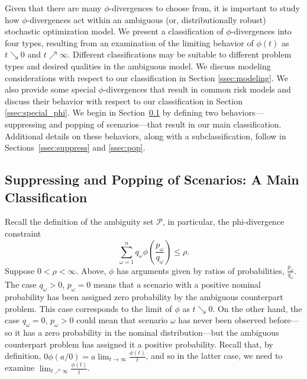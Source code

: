 \documentclass[opre,nonblindrev]{informs3} %
\begin{document}
Given that there are many $\phi$-divergences to choose from, it is important to study how $\phi$-divergences act within an ambiguous (or, distributionally robust) stochastic optimization model. 
We present a classification of $\phi$-divergences into four types, resulting from an examination of the limiting behavior of $\phi(t)$ as $t \searrow 0$ and $t \nearrow \infty$.
Different classifications may be suitable to different problem types and desired qualities in the ambiguous model.
We discuss modeling considerations with respect to our classification in Section \ref{ssec:modeling}.
We also provide some special $\phi$-divergences that result in common risk models and discuss their behavior with respect to our classification in Section \ref{ssec:special_phi}.
We begin in Section~\ref{ssec:suppressandpop} by defining two behaviors---suppressing and popping of scenarios---that result in our main classification. 
Additional details on these behaviors, along with a subclassification, follow in Sections~\ref{ssec:suppress} and \ref{ssec:pop}. 


\subsection{Suppressing and Popping of Scenarios: A Main Classification}
\label{ssec:suppressandpop}

Recall the definition of the ambiguity set $\mathcal{P}$, in particular, the phi-divergence constraint 
\[
\sum_{\omega = 1}^{n} q_\omega \phi\left(\frac{p_\omega}{q_\omega}\right) \leq \rho. 
\]
Suppose $0<\rho<\infty$. 
Above, $\phi$ has arguments given by ratios of probabilities, $\tfrac{p_\omega}{q_\omega}$. 
The case $q_\omega > 0$, $p_\omega = 0$ means that a scenario with a positive nominal probability has been assigned zero probability by the ambiguous counterpart problem. 
This case corresponds to the limit of $\phi$ as $t \searrow 0$. 
On the other hand, the case  $q_\omega = 0$, $p_\omega > 0$ could mean that scenario $\omega$ has never been observed before---so it has a zero probability in the nominal distribution---but the ambiguous counterpart problem has assigned it a positive probability. 
Recall that, by definition, $0 \phi(a/0) = a \lim_{t \rightarrow \infty} \frac{\phi(t)}{t}$, and so in the latter case, we need to examine $\lim_{t \nearrow \infty} \frac{\phi(t)}{t}$.  
\end{document}
